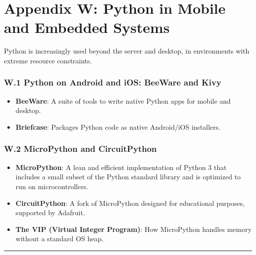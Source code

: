 \hypertarget{appendix-w-python-in-mobile-and-embedded-systems}{%
\chapter{Appendix W: Python in Mobile and Embedded
Systems}\label{appendix-w-python-in-mobile-and-embedded-systems}}

Python is increasingly used beyond the server and desktop, in
environments with extreme resource constraints.

\hypertarget{w.1-python-on-android-and-ios-beeware-and-kivy}{%
\subsection{W.1 Python on Android and iOS: BeeWare and
Kivy}\label{w.1-python-on-android-and-ios-beeware-and-kivy}}

\begin{itemize}
\tightlist
\item
  \textbf{BeeWare}: A suite of tools to write native Python apps for
  mobile and desktop.
\item
  \textbf{Briefcase}: Packages Python code as native Android/iOS
  installers.
\end{itemize}

\hypertarget{w.2-micropython-and-circuitpython}{%
\subsection{W.2 MicroPython and
CircuitPython}\label{w.2-micropython-and-circuitpython}}

\begin{itemize}
\tightlist
\item
  \textbf{MicroPython}: A lean and efficient implementation of Python 3
  that includes a small subset of the Python standard library and is
  optimized to run on microcontrollers.
\item
  \textbf{CircuitPython}: A fork of MicroPython designed for educational
  purposes, supported by Adafruit.
\item
  \textbf{The VIP (Virtual Integer Program)}: How MicroPython handles
  memory without a standard OS heap.
\end{itemize}

\begin{center}\rule{0.5\linewidth}{0.5pt}\end{center}
